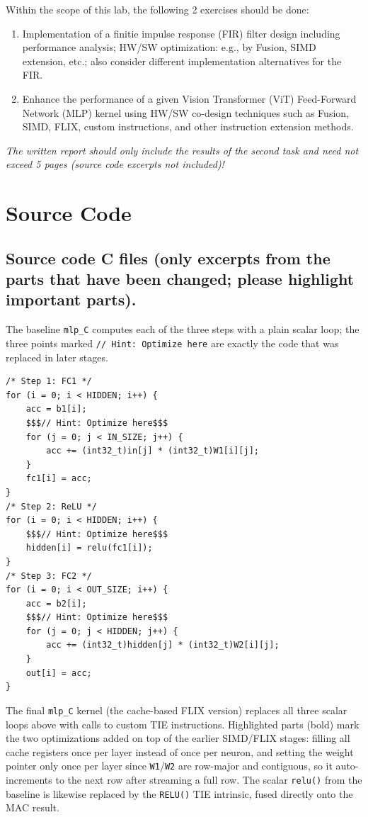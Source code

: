 \documentclass[11pt,a4paper]{report}
\begin{document}
Within the scope of this lab, the following 2 exercises should be done:

\begin{enumerate}
\item Implementation of a finitie impulse response (FIR) filter design including
    performance analysis; HW/SW optimization: e.g., by Fusion, SIMD extension,
    etc.; also consider different implementation alternatives for the FIR.
\item Enhance the performance of a given Vision Transformer (ViT) Feed-Forward Network (MLP) kernel using HW/SW co-design techniques such as Fusion, SIMD, FLIX, custom instructions, and other instruction extension methods.
\end{enumerate}

\noindent\emph{The written report should only include the results of the second task and
need not exceed 5 pages (source code excerpts not included)!}\\

\chapter*{Source Code}

\section*{Source code C files (only excerpts from the parts that have been
changed; please highlight important parts).}

The baseline \texttt{mlp\_C} computes each of the three steps
with a plain scalar loop; the three points marked \texttt{// Hint:
Optimize here} are exactly the code that was replaced in later stages.

\begin{lstlisting}
/* Step 1: FC1 */
for (i = 0; i < HIDDEN; i++) {
    acc = b1[i];
    $$$// Hint: Optimize here$$$
    for (j = 0; j < IN_SIZE; j++) {
        acc += (int32_t)in[j] * (int32_t)W1[i][j];
    }
    fc1[i] = acc;
}
/* Step 2: ReLU */
for (i = 0; i < HIDDEN; i++) {
    $$$// Hint: Optimize here$$$
    hidden[i] = relu(fc1[i]);
}
/* Step 3: FC2 */
for (i = 0; i < OUT_SIZE; i++) {
    acc = b2[i];
    $$$// Hint: Optimize here$$$
    for (j = 0; j < HIDDEN; j++) {
        acc += (int32_t)hidden[j] * (int32_t)W2[i][j];
    }
    out[i] = acc;
}
\end{lstlisting}

The final \texttt{mlp\_C} kernel (the cache-based FLIX version)
replaces all three scalar loops above with calls to custom TIE
instructions. Highlighted parts (bold) mark the two optimizations added
on top of the earlier SIMD/FLIX stages: filling all cache registers once
per layer instead of once per neuron, and setting the weight pointer only
once per layer since \texttt{W1}/\texttt{W2} are row-major and contiguous,
so it auto-increments to the next row after streaming a full row. The
scalar \texttt{relu()} from the baseline is likewise replaced by the
\texttt{RELU()} TIE intrinsic, fused directly onto the MAC result.
\end{document}
